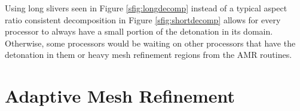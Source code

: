 \noindent Using long slivers seen in Figure \ref{sfig:longdecomp} instead of a typical aspect ratio consistent decomposition in Figure \ref{sfig:shortdecomp} allows for every processor to always have a small portion of the detonation in its domain. Otherwise, some processors would be waiting on other processors that have the detonation in them or heavy mesh refinement regions from the AMR routines.




\section{Adaptive Mesh Refinement}

